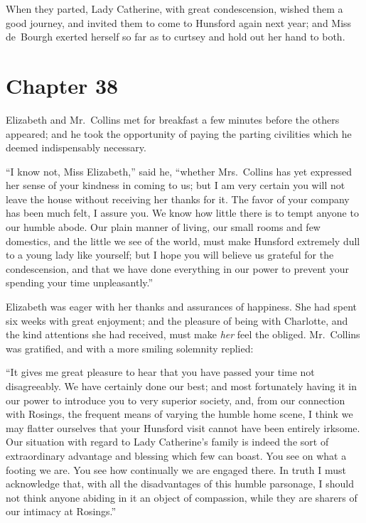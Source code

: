 When they parted, Lady Catherine, with great condescension,
wished them a good journey, and invited them to come to
Hunsford again next year; and Miss de~Bourgh exerted herself
so far as to curtsey and hold out her hand to both.



\chapter{Chapter 38}


 Elizabeth and Mr.\ Collins met for breakfast
a few minutes before the others appeared; and he took the
opportunity of paying the parting civilities which he deemed
indispensably necessary.

``I know not, Miss Elizabeth,'' said he, ``whether Mrs.\ Collins has
yet expressed her sense of your kindness in coming to us; but I
am very certain you will not leave the house without receiving
her thanks for it.  The favor of your company has been much
felt, I assure you.  We know how little there is to tempt anyone
to our humble abode.  Our plain manner of living, our small
rooms and few domestics, and the little we see of the world,
must make Hunsford extremely dull to a young lady like
yourself; but I hope you will believe us grateful for the
condescension, and that we have done everything in our power
to prevent your spending your time unpleasantly.''

Elizabeth was eager with her thanks and assurances of happiness.
She had spent six weeks with great enjoyment; and the pleasure
of being with Charlotte, and the kind attentions she had received,
must make \emph{her} feel the obliged.  Mr.\ Collins was gratified, and
with a more smiling solemnity replied:

``It gives me great pleasure to hear that you have passed your
time not disagreeably.  We have certainly done our best; and
most fortunately having it in our power to introduce you to very
superior society, and, from our connection with Rosings, the
frequent means of varying the humble home scene, I think we
may flatter ourselves that your Hunsford visit cannot have been
entirely irksome.  Our situation with regard to Lady Catherine's
family is indeed the sort of extraordinary advantage and blessing
which few can boast.  You see on what a footing we are.  You
see how continually we are engaged there.  In truth I must
acknowledge that, with all the disadvantages of this humble
parsonage, I should not think anyone abiding in it an object of
compassion, while they are sharers of our intimacy at Rosings.''

